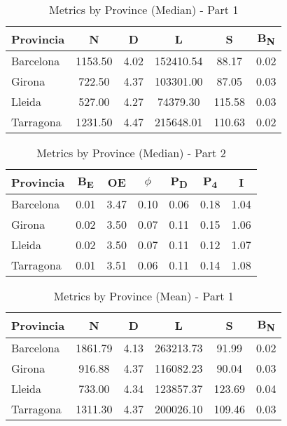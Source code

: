 \begin{table}[h!]
\centering
\begin{tabular}{lccccc}
\hline
Provincia & \textbf{N} & \textbf{D} & \textbf{L} & \textbf{S} & \textbf{B\textsubscript{N}} \\
\hline
Barcelona & 1153.50 & 4.02 & 152410.54 & 88.17 & 0.02 \\
Girona & 722.50 & 4.37 & 103301.00 & 87.05 & 0.03 \\
Lleida & 527.00 & 4.27 & 74379.30 & 115.58 & 0.03 \\
Tarragona & 1231.50 & 4.47 & 215648.01 & 110.63 & 0.02 \\
\hline
\end{tabular}
\caption {Metrics by Province (Median) - Part 1}
\end{table}

\begin{table}[h!]
\centering
\begin{tabular}{lcccccc}
\hline
Provincia & \textbf{B\textsubscript{E}} & \textbf{OE} & \textbf{$\phi$} & \textbf{P\textsubscript{D}} & \textbf{P\textsubscript{4}} & \textbf{I} \\
\hline
Barcelona & 0.01 & 3.47 & 0.10 & 0.06 & 0.18 & 1.04 \\
Girona & 0.02 & 3.50 & 0.07 & 0.11 & 0.15 & 1.06 \\
Lleida & 0.02 & 3.50 & 0.07 & 0.11 & 0.12 & 1.07 \\
Tarragona & 0.01 & 3.51 & 0.06 & 0.11 & 0.14 & 1.08 \\
\hline
\end{tabular}
\caption {Metrics by Province (Median) - Part 2}
\end{table}

\begin{table}[h!]
\centering
\begin{tabular}{lccccc}
\hline
Provincia & \textbf{N} & \textbf{D} & \textbf{L} & \textbf{S} & \textbf{B\textsubscript{N}} \\
\hline
Barcelona & 1861.79 & 4.13 & 263213.73 & 91.99 & 0.02 \\
Girona & 916.88 & 4.37 & 116082.23 & 90.04 & 0.03 \\
Lleida & 733.00 & 4.34 & 123857.37 & 123.69 & 0.04 \\
Tarragona & 1311.30 & 4.37 & 200026.10 & 109.46 & 0.03 \\
\hline
\end{tabular}
\caption {Metrics by Province (Mean) - Part 1}
\end{table}

